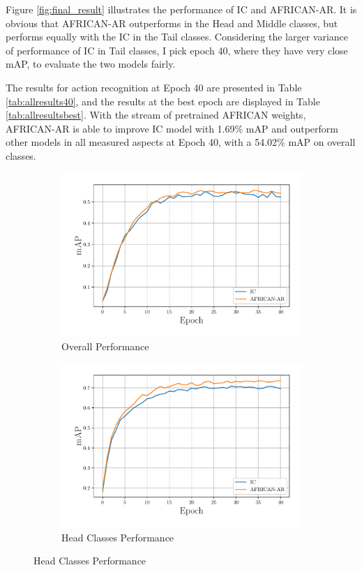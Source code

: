 Figure \ref{fig:final_result} illustrates the performance of IC and AFRICAN-AR. It is obvious that AFRICAN-AR outperforms in the Head and Middle classes, but performs equally with the IC in the Tail classes. Considering the larger variance of performance of IC in Tail classes, I pick epoch 40, where they have very close mAP, to evaluate the two models fairly.

The results for action recognition at Epoch 40 are presented in Table \ref{tab:allresults40}, and the results at the best epoch are displayed in Table \ref{tab:allresultsbest}. With the stream of pretrained AFRICAN weights, AFRICAN-AR is able to improve IC model with 1.69\% mAP and outperform other models in all measured aspects at Epoch 40, with a 54.02\% mAP on overall classes.

\begin{figure}
    \centering
    \begin{adjustwidth}{-0.15\linewidth}{-0.07\linewidth}
    \begin{subfigure}[b]{0.65\textwidth}
        \includegraphics[width=\textwidth]{assets/charts/4_4_finalscore_0_overall}
        \caption{Overall Performance}
        \label{fig:subfig1}
    \end{subfigure}
    \begin{subfigure}[b]{0.65\textwidth}
        \includegraphics[width=\textwidth]{assets/charts/4_4_finalscore_1_head}
        \caption{Head Classes Performance}
        \label{fig:subfig2}
    \end{subfigure}


\end{adjustwidth}
\end{figure}
